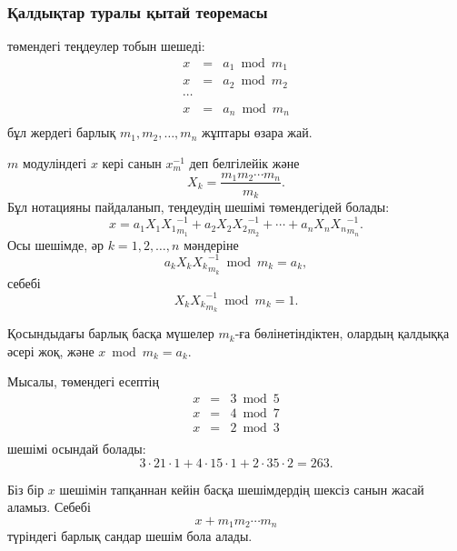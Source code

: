 \subsubsection{Қалдықтар туралы қытай теоремасы}


 төмендегі 
теңдеулер тобын шешеді:
\[
\begin{array}{lcl}
x & = & a_1 \bmod m_1 \\
x & = & a_2 \bmod m_2 \\
\cdots \\
x & = & a_n \bmod m_n \\
\end{array}
\]
бұл жердегі барлық $m_1,m_2,\ldots,m_n$ жұптары өзара жай.

$m$ модуліндегі $x$ кері санын $x^{-1}_m$ деп белгілейік
және \[ X_k = \frac{m_1 m_2 \cdots m_n}{m_k}.\]
Бұл нотацияны пайдаланып, теңдеудің шешімі төмендегідей  болады:
\[x = a_1 X_1 {X_1}^{-1}_{m_1} + a_2 X_2 {X_2}^{-1}_{m_2} + \cdots + a_n X_n {X_n}^{-1}_{m_n}.\]
Осы шешімде, әр $k=1,2,\ldots,n$ мәндеріне
\[a_k X_k {X_k}^{-1}_{m_k} \bmod m_k = a_k,\]
себебі
\[X_k {X_k}^{-1}_{m_k} \bmod m_k = 1.\]

Қосындыдағы барлық басқа мүшелер $m_k$-ға бөлінетіндіктен,
олардың қалдыққа әсері жоқ, және $x \bmod m_k = a_k$.

Мысалы, төмендегі есептің
\[
\begin{array}{lcl}
x & = & 3 \bmod 5 \\
x & = & 4 \bmod 7 \\
x & = & 2 \bmod 3 \\
\end{array}
\]
шешімі осындай болады:
\[ 3 \cdot 21 \cdot 1 + 4 \cdot 15 \cdot 1 + 2 \cdot 35 \cdot 2 = 263.\]

Біз бір $x$ шешімін тапқаннан кейін басқа шешімдердің
шексіз санын жасай аламыз. Себебі \[x+m_1 m_2 \cdots m_n\] түріндегі
барлық сандар шешім бола алады.

